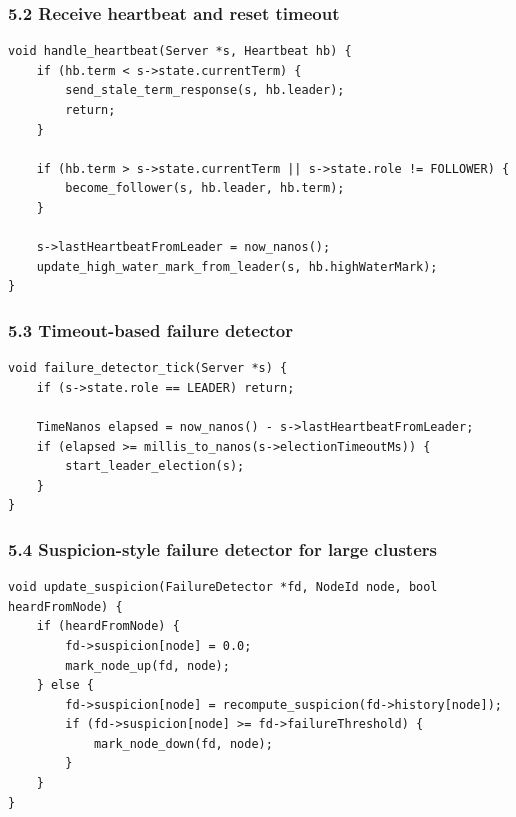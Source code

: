\documentclass[10pt,letterpaper]{article}
\begin{document}
\subsubsection*{5.2 Receive heartbeat and reset timeout}

\begin{verbatim}
void handle_heartbeat(Server *s, Heartbeat hb) {
    if (hb.term < s->state.currentTerm) {
        send_stale_term_response(s, hb.leader);
        return;
    }

    if (hb.term > s->state.currentTerm || s->state.role != FOLLOWER) {
        become_follower(s, hb.leader, hb.term);
    }

    s->lastHeartbeatFromLeader = now_nanos();
    update_high_water_mark_from_leader(s, hb.highWaterMark);
}
\end{verbatim}

\subsubsection*{5.3 Timeout-based failure detector}

\begin{verbatim}
void failure_detector_tick(Server *s) {
    if (s->state.role == LEADER) return;

    TimeNanos elapsed = now_nanos() - s->lastHeartbeatFromLeader;
    if (elapsed >= millis_to_nanos(s->electionTimeoutMs)) {
        start_leader_election(s);
    }
}
\end{verbatim}

\subsubsection*{5.4 Suspicion-style failure detector for large clusters}

\begin{verbatim}
void update_suspicion(FailureDetector *fd, NodeId node, bool heardFromNode) {
    if (heardFromNode) {
        fd->suspicion[node] = 0.0;
        mark_node_up(fd, node);
    } else {
        fd->suspicion[node] = recompute_suspicion(fd->history[node]);
        if (fd->suspicion[node] >= fd->failureThreshold) {
            mark_node_down(fd, node);
        }
    }
}
\end{verbatim}
\end{document}
